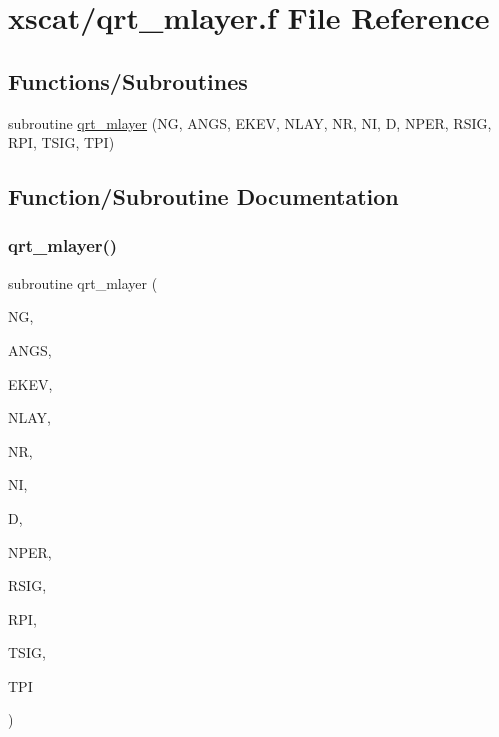 \hypertarget{qrt__mlayer_8f}{}\section{xscat/qrt\+\_\+mlayer.f File Reference}
\label{qrt__mlayer_8f}
\subsection*{Functions/\+Subroutines}
\begin{DoxyCompactItemize}
\item 
subroutine \hyperlink{qrt__mlayer_8f_a1ef554a056492bd8f7b00908b40f4437}{qrt\+\_\+mlayer} (NG, A\+N\+GS, E\+K\+EV, N\+L\+AY, NR, NI, D, N\+P\+ER, R\+S\+IG, R\+PI, T\+S\+IG, T\+PI)
\end{DoxyCompactItemize}


\subsection{Function/\+Subroutine Documentation}
\mbox{\label{qrt__mlayer_8f_a1ef554a056492bd8f7b00908b40f4437}} 
\subsubsection{\texorpdfstring{qrt\+\_\+mlayer()}{qrt\_mlayer()}}
{\footnotesize\ttfamily subroutine qrt\+\_\+mlayer (\begin{DoxyParamCaption}\item[{integer}]{NG,  }\item[{double precision, dimension(ng)}]{A\+N\+GS,  }\item[{double precision}]{E\+K\+EV,  }\item[{integer}]{N\+L\+AY,  }\item[{double precision, dimension(nlay)}]{NR,  }\item[{double precision, dimension(nlay)}]{NI,  }\item[{double precision, dimension(nlay)}]{D,  }\item[{integer}]{N\+P\+ER,  }\item[{double precision, dimension(ng)}]{R\+S\+IG,  }\item[{double precision, dimension(ng)}]{R\+PI,  }\item[{double precision, dimension(ng)}]{T\+S\+IG,  }\item[{double precision, dimension(ng)}]{T\+PI }\end{DoxyParamCaption})}

